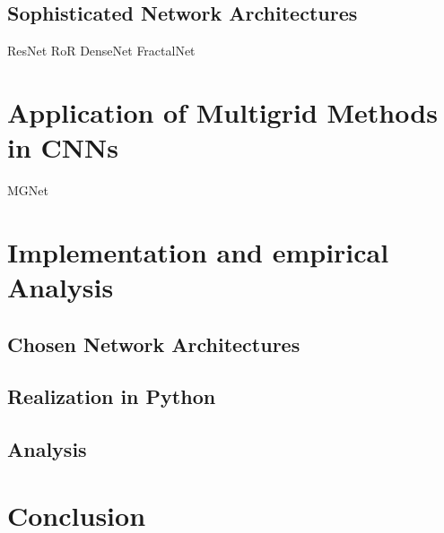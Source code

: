 \documentclass[a4paper,12pt,titlepage,enabledeprecatedfontcommands]{scrreprt}
\begin{document}
\section{Sophisticated Network Architectures}
ResNet
RoR
DenseNet
FractalNet
\chapter{Application of Multigrid Methods in CNNs}
MGNet
\chapter{Implementation and empirical Analysis}
\section{Chosen Network Architectures}
\section{Realization in Python}
\section{Analysis}
\chapter{Conclusion}


 \label{bibtex}
\end{document}
